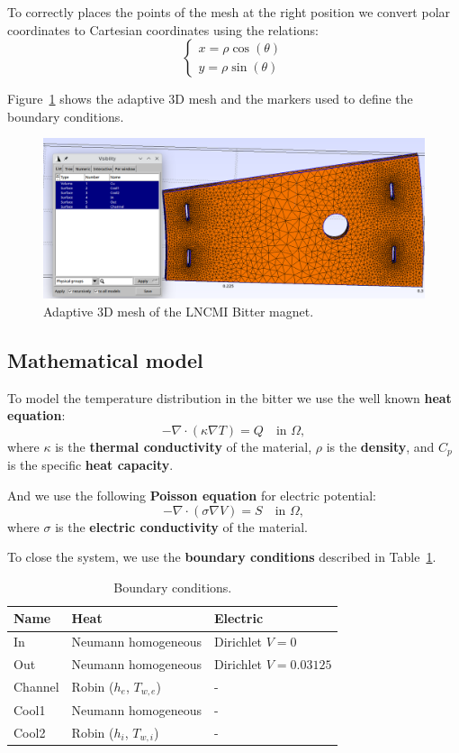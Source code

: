\documentclass[12pt]{article}
\begin{document}
To correctly places the points of the mesh at the right position we convert polar
coordinates to Cartesian coordinates using the relations:
$$
\begin{cases}
  x = \rho \cos(\theta) \\
  y = \rho \sin(\theta)
\end{cases}
$$

Figure~\ref{fig:mesh} shows the adaptive 3D mesh and the markers used to define
the boundary conditions.

\begin{figure}[H]
  \centering
  \includegraphics[width=\textwidth]{images/bitter_mesh.png}
  \caption{Adaptive 3D mesh of the LNCMI Bitter magnet.}
  \label{fig:mesh}
\end{figure}

\subsection{Mathematical model}
To model the temperature distribution in the bitter we use the well known \textbf{heat equation}:
$$
-\nabla \cdot (\kappa \nabla T) = Q \quad \text{in } \Omega,
$$
where $\kappa$ is the \textbf{thermal conductivity} of the material, $\rho$ is
the \textbf{density}, and $C_p$ is the specific \textbf{heat capacity}.

\noindent And we use the following \textbf{Poisson equation} for electric potential:
$$
- \nabla \cdot (\sigma \nabla V) = S \quad \text{in } \Omega,
$$
where $\sigma$ is the \textbf{electric conductivity} of the material.

To close the system, we use the \textbf{boundary conditions} described in
Table~\ref{tab:boundary_conditions}.

\begin{table}[H]
  \centering
  \renewcommand{\arraystretch}{1.5} %
  \begin{tabular}{p{3cm}p{5cm}p{4cm}}
    \toprule
    \textbf{Name} & \textbf{Heat} & \textbf{Electric} \\
    \midrule
    In & Neumann homogeneous & Dirichlet $V = 0$ \\
    Out & Neumann homogeneous & Dirichlet $V = 0.03125$ \\
    Channel & Robin ($h_e$, $T_{w,e}$) & - \\
    Cool1 & Neumann homogeneous & - \\
    Cool2 & Robin ($h_i$, $T_{w,i}$) & - \\
    \bottomrule
  \end{tabular}
  \caption{Boundary conditions.}
  \label{tab:boundary_conditions}
\end{table}
\end{document}
